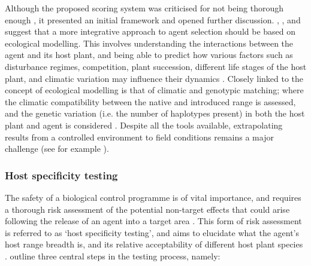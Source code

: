 \vspace{0.4cm}
Although the proposed scoring system was criticised for not being thorough enough \citep{wapshere1985effectiveness, cullen1995, kriticos2003}, it presented an initial framework and opened further discussion. \citet{cullen1995}, \citet{kriticos2003}, and \citet{klinken2006scientific} suggest that a more integrative approach to agent selection should be based on ecological modelling. This involves understanding the interactions between the agent and its host plant, and being able to predict how various factors such as disturbance regimes, competition, plant succession, different life stages of the host plant, and climatic variation may influence their dynamics \citep{mcevoy1999biological}. 
Closely linked to the concept of ecological modelling is that of climatic and genotypic matching; where the climatic compatibility between the native and introduced range is assessed, and the genetic variation (i.e. the number of haplotypes present) in both the host plant and agent is considered \citep{iline2004allozyme, dhileepan2006systematic, goolsby2006matching, robertson2008climate, Paterson2009UsingControl, VanDriesche2009, paterson2014prioritisation, fischbein2019modelling, jourdan2019sourcing, sutton2019searching}.
 Despite all the tools available, extrapolating results from a controlled environment to field conditions remains a major challenge (see for example \citet{buccellato2019post}). 

\subsubsection{Host specificity testing}

The safety of a biological control programme is of vital importance, and requires a thorough risk assessment of the potential non-target effects that could arise following the release of an agent into a target area \citep{mcevoy1996host, secord1996perils, mcfadyen1998biological, heard1999concepts, vanklinken1999host, schaffner2001host, heard2002host, VanDriesche2009}. This form of risk assessment is referred to as `host specificity testing', and aims to elucidate what the agent's host range breadth is, and its relative acceptability of different host plant species \citep{vanklinken1999host}.  \citet{vanklinken1999host} outline three central steps in the testing process, namely: 
\vspace{0.4cm}

